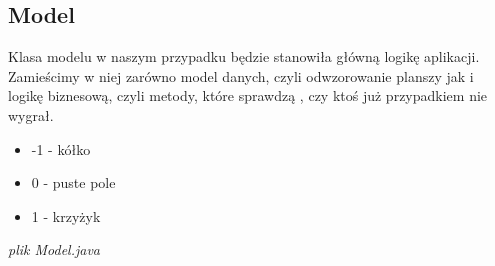 \documentclass[letterpaper,10pt,english]{sphinxmanual}
\begin{document}
\subsection{Model}
\label{summary:model}
Klasa modelu w naszym przypadku będzie stanowiła główną logikę aplikacji. Zamieścimy w niej zarówno model danych, czyli odwzorowanie planszy jak i logikę biznesową, czyli metody, które sprawdzą , czy ktoś już przypadkiem nie wygrał.
\begin{itemize}
\item {} 
-1 - kółko

\item {} 
0 - puste pole

\item {} 
1 - krzyżyk

\end{itemize}

\emph{plik Model.java}
\end{document}
